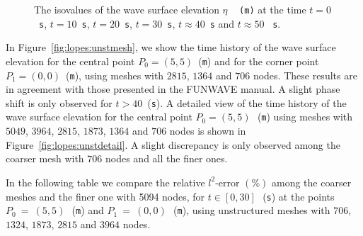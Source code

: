 \begin{figure}
    \caption{The isovalues of the wave surface elevation $\eta$\,~{\tt
        (m)} at the time $t=0$~{\tt s}, $t=10$~{\tt s}, $t=20$~{\tt s},
      $t=30$~{\tt s}, $t\approx40$~{\tt s} and $t\approx50$ ~{\tt s}.}
  \label{fig:lopes:symmetry}
\end{figure}

In Figure~\ref{fig:lopes:unstmesh}, we show the time history of the
wave surface elevation for the central point $P_0=(5,5)$~({\tt m}) and
for the corner point $P_1=(0,0)$~({\tt m}), using meshes with $2815$,
$1364$ and $706$ nodes.  These results are in agreement with those
presented in the FUNWAVE manual. A slight phase shift is only observed
for $t>40$~({\tt s}).  A detailed view of the time history of the wave
surface elevation for the central point $P_0=(5,5)$\,~({\tt m}) using
meshes with $5049$, $3964$, $2815$, $1873$, $1364$ and $706$ nodes is
shown in Figure~\ref{fig:lopes:unstdetail}. A slight discrepancy is
only observed among the coarser mesh with $706$ nodes and all the
finer ones.



In the following table we compare the relative $l^2$-error $(\%)$
among the coarser meshes and the finer one with 5094 nodes, for
$t\in[0,30]$\,~({\tt s}) at the points $P_0~=~(5,5)$\,~({\tt m}) and
$P_1~=~(0,0)$\,~({\tt m}), using unstructured meshes with $706$,
$1324$, $1873$, $2815$ and $3964$ nodes.

